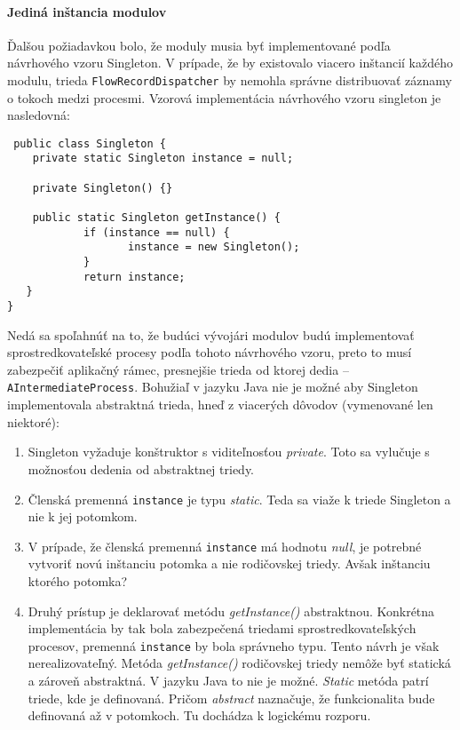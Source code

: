 \paragraph{Jediná inštancia modulov} \label{sec:singleton}
Ďalšou požiadavkou bolo, že moduly musia byť implementované podľa návrhového vzoru Singleton. V prípade, že
by existovalo viacero inštancií každého modulu, trieda \verb|FlowRecordDispatcher| by nemohla správne 
distribuovať záznamy o tokoch medzi procesmi. Vzorová implementácia návrhového
vzoru singleton je nasledovná:  
\begin{verbatim}
 public class Singleton {
    private static Singleton instance = null;
 
    private Singleton() {}
 
    public static Singleton getInstance() {
            if (instance == null) {
                   instance = new Singleton();
            }
            return instance;
   }
}
\end{verbatim}
Nedá sa spoľahnúť na to, že budúci vývojári modulov budú implementovať sprostredkovateľské procesy 
podľa tohoto návrhového vzoru, preto to musí zabezpečiť aplikačný rámec, presnejšie trieda od ktorej 
dedia -- \verb|AIntermediateProcess|.
Bohužiaľ v jazyku Java nie je možné aby Singleton implementovala abstraktná trieda, hneď z viacerých
dôvodov (vymenované len niektoré):
\begin{enumerate}
 \item Singleton vyžaduje konštruktor s viditeľnosťou \emph{private}. Toto sa vylučuje s možnosťou 
 dedenia od abstraktnej triedy.
 \item Členská premenná \verb|instance| je typu \emph{static}. Teda sa viaže k triede Singleton a nie k jej 
 potomkom.
 \item V prípade, že členská premenná \verb|instance| má hodnotu \emph{null}, je potrebné vytvoriť novú inštanciu 
 potomka a nie rodičovskej triedy. Avšak inštanciu ktorého potomka?
 \item Druhý prístup je deklarovať metódu \emph{getInstance()} abstraktnou. Konkrétna implementácia 
 by tak bola zabezpečená triedami sprostredkovateľských procesov, premenná \verb|instance|
 by bola správneho typu. Tento návrh je však nerealizovateľný. 
 Metóda \emph{getInstance()} rodičovskej triedy nemôže byť statická a zároveň abstraktná. V jazyku Java
 to nie je možné. 
 \emph{Static} metóda patrí triede, kde je definovaná. 
 Pričom \emph{abstract} naznačuje, že funkcionalita bude definovaná až v potomkoch. Tu dochádza k 
 logickému rozporu.
\end{enumerate}
